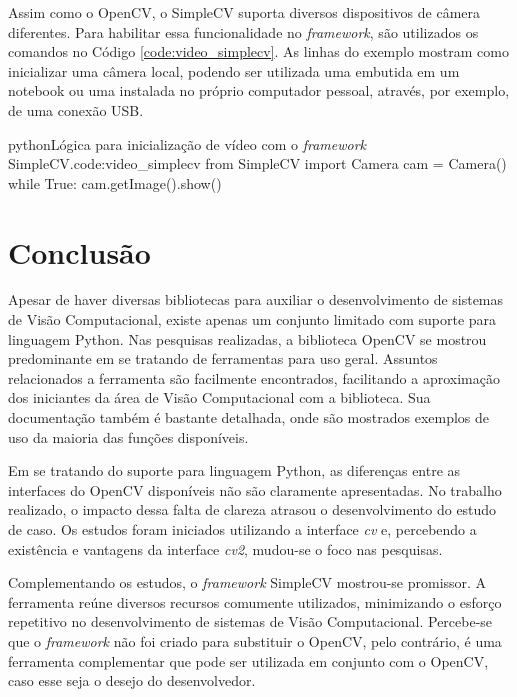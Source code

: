 Assim como o OpenCV, o SimpleCV suporta diversos dispositivos de câmera diferentes. Para habilitar essa funcionalidade no \textit{framework}, são utilizados os comandos no Código \ref{code:video_simplecv}. As linhas do exemplo mostram como inicializar uma câmera local, podendo ser utilizada  uma embutida em um notebook ou uma instalada no próprio computador pessoal, através, por exemplo, de uma conexão USB.\newline\newline\newline\newline


\begin{code}{python}{Lógica para inicialização de vídeo com o \textit{framework} SimpleCV.}{code:video_simplecv}
from SimpleCV import Camera
cam = Camera()
while True:
	cam.getImage().show()
\end{code}

\section{Conclusão}

Apesar de haver diversas bibliotecas para auxiliar o desenvolvimento de sistemas de Visão Computacional, existe apenas um conjunto limitado com suporte para linguagem Python. Nas pesquisas realizadas, a biblioteca OpenCV se mostrou predominante em se tratando de ferramentas para uso geral. Assuntos relacionados a ferramenta são facilmente encontrados, facilitando a aproximação dos iniciantes da área de Visão Computacional com a biblioteca. Sua documentação também é bastante detalhada, onde são mostrados exemplos de uso da maioria das funções disponíveis.

Em se tratando do suporte para linguagem Python, as diferenças entre as interfaces do OpenCV disponíveis não são claramente apresentadas. No trabalho realizado, o impacto dessa falta de clareza atrasou o desenvolvimento do estudo de caso. Os estudos foram iniciados utilizando a interface \textit{cv} e, percebendo a existência e vantagens da interface \textit{cv2}, mudou-se o foco nas pesquisas.

Complementando os estudos, o \textit{framework} SimpleCV mostrou-se promissor. A ferramenta reúne diversos recursos comumente utilizados, minimizando o esforço repetitivo no desenvolvimento de sistemas de Visão Computacional. Percebe-se que o \textit{framework} não foi criado para substituir o OpenCV, pelo contrário, é uma ferramenta complementar que pode ser utilizada em conjunto com o OpenCV, caso esse seja o desejo do desenvolvedor.

